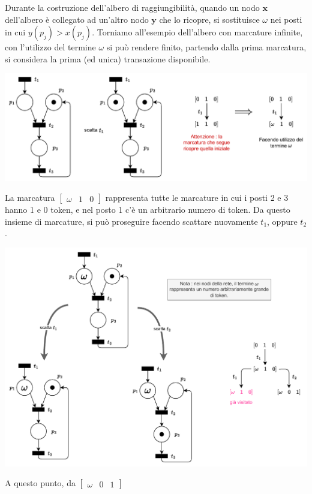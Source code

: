\documentclass[10pt, letterpaper]{report}
\begin{document}
Durante la costruzione dell'albero di raggiungibilità, quando un nodo $\mathbf x$ dell'albero è collegato ad un'altro nodo $\mathbf y$ che lo ricopre, si sostituisce $\omega$ nei posti in cui $y(p_j)>x(p_j)$.\acc 
Torniamo all'esempio dell'albero con marcature infinite, con l'utilizzo del termine $\omega$ si può rendere finito, partendo dalla prima marcatura, si considera la prima (ed unica) transazione disponibile.
\begin{center}
    \includegraphics[width=\textwidth]{images/alberoIll3.drawio.pdf}
\end{center}
La marcatura $\begin{bmatrix}
    \omega & 1 & 0
\end{bmatrix}$
rappresenta tutte le marcature in cui i posti 2 e 3 hanno 1 e 0 token, e nel posto 1 c'è un arbitrario numero di token. Da questo insieme di marcature, si può proseguire facendo scattare nuovamente $t_1$, oppure $t_2$.
\begin{center}
    \includegraphics[width=\textwidth]{images/AlberoIll4.drawio.pdf}
\end{center}
A questo punto, da $\begin{bmatrix}
    \omega & 0 & 1
\end{bmatrix}$
\end{document}
